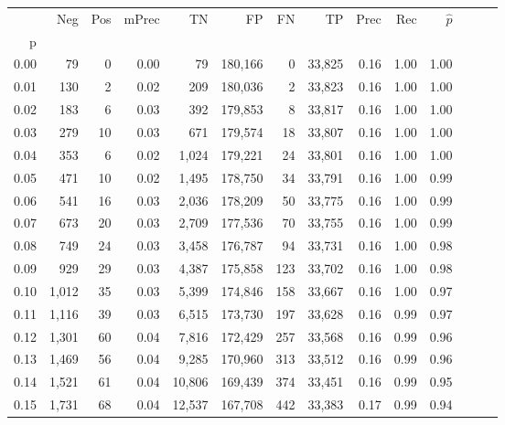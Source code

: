 \begin{tabular}{rrrrrrrrrrrrrr}
\toprule
{} &    Neg &  Pos & mPrec &       TN &       FP &      FN &      TP &  Prec &   Rec & $\hat{p}$ \\
p    &        &      &       &          &          &         &         &       &       &           \\
\midrule
0.00 &     79 &    0 &  0.00 &       79 &  180,166 &       0 &  33,825 &  0.16 &  1.00 &      1.00 \\
0.01 &    130 &    2 &  0.02 &      209 &  180,036 &       2 &  33,823 &  0.16 &  1.00 &      1.00 \\
0.02 &    183 &    6 &  0.03 &      392 &  179,853 &       8 &  33,817 &  0.16 &  1.00 &      1.00 \\
0.03 &    279 &   10 &  0.03 &      671 &  179,574 &      18 &  33,807 &  0.16 &  1.00 &      1.00 \\
0.04 &    353 &    6 &  0.02 &    1,024 &  179,221 &      24 &  33,801 &  0.16 &  1.00 &      1.00 \\
0.05 &    471 &   10 &  0.02 &    1,495 &  178,750 &      34 &  33,791 &  0.16 &  1.00 &      0.99 \\
0.06 &    541 &   16 &  0.03 &    2,036 &  178,209 &      50 &  33,775 &  0.16 &  1.00 &      0.99 \\
0.07 &    673 &   20 &  0.03 &    2,709 &  177,536 &      70 &  33,755 &  0.16 &  1.00 &      0.99 \\
0.08 &    749 &   24 &  0.03 &    3,458 &  176,787 &      94 &  33,731 &  0.16 &  1.00 &      0.98 \\
0.09 &    929 &   29 &  0.03 &    4,387 &  175,858 &     123 &  33,702 &  0.16 &  1.00 &      0.98 \\
0.10 &  1,012 &   35 &  0.03 &    5,399 &  174,846 &     158 &  33,667 &  0.16 &  1.00 &      0.97 \\
0.11 &  1,116 &   39 &  0.03 &    6,515 &  173,730 &     197 &  33,628 &  0.16 &  0.99 &      0.97 \\
0.12 &  1,301 &   60 &  0.04 &    7,816 &  172,429 &     257 &  33,568 &  0.16 &  0.99 &      0.96 \\
0.13 &  1,469 &   56 &  0.04 &    9,285 &  170,960 &     313 &  33,512 &  0.16 &  0.99 &      0.96 \\
0.14 &  1,521 &   61 &  0.04 &   10,806 &  169,439 &     374 &  33,451 &  0.16 &  0.99 &      0.95 \\
0.15 &  1,731 &   68 &  0.04 &   12,537 &  167,708 &     442 &  33,383 &  0.17 &  0.99 &      0.94 \\

\end{tabular}
